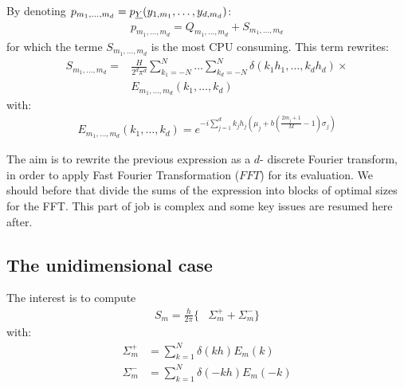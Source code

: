 By denoting $p_{m_1,\hdots,m_d}=p_{{\underline{Y}}}(y_{1,m_1},\hdots,y_{d,m_d})$:
\begin{align}
  p_{m_1,\hdots,m_d}= Q_{m_1,\hdots,m_d}+S_{m_1,\hdots,m_d}
\end{align}
for which the terme $S_{m_1,\hdots,m_d}$ is the most CPU consuming. This term rewrites:
\begin{align}
S_{m_1,\hdots,m_d}=&\frac{H}{2^d\pi^d}\sum_{k_1=-N}^{N}\hdots\sum_{k_d=-N}^{N}\delta\left(k_1h_1,\hdots,k_dh_d\right)\times\nonumber\\
&E_{m_1,\hdots,m_d}(k_1,\hdots,k_d)
\end{align}
with:
\begin{align}
  E_{m_1,\hdots,m_d}(k_1,\hdots,k_d)=e^{-i\sum_{j=1}^d k_jh_j\left(\mu_j+b\left(\frac{2m_j+1}{M}-1\right)\sigma_j\right)}
\end{align}

The aim is to rewrite the previous expression as a $d$- discrete Fourier transform, in order to apply Fast Fourier Transformation ($FFT$) for its evaluation.
We should before that divide the sums of the expression into blocks of optimal sizes for the FFT. This part of job is complex and some key issues are resumed here after.

\subsection{The unidimensional case}

The interest is to compute
\begin{align}
S_{m}=\frac{h}{2\pi}\Big\{&\Sigma_{m}^{+} + \Sigma_{m}^{-} \Big\}
\end{align}
with:
\begin{align}
\Sigma_{m}^{+}&=\sum_{k=1}^{N}\delta( kh)E_{m}(k)\\
\Sigma_{m}^{-}&=\sum_{k=1}^{N}\delta(-kh)E_{m}(-k)\\
\end{align}

